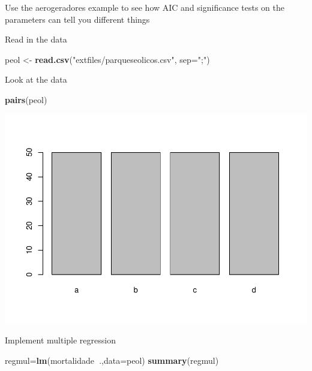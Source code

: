 \documentclass[
]{book}
\newenvironment{Shaded}{\begin{snugshade}}{\end{snugshade}}
\newcommand{\DataTypeTok}[1]{\textcolor[rgb]{0.13,0.29,0.53}{#1}}
\newcommand{\KeywordTok}[1]{\textcolor[rgb]{0.13,0.29,0.53}{\textbf{#1}}}
\newcommand{\NormalTok}[1]{#1}
\newcommand{\OperatorTok}[1]{\textcolor[rgb]{0.81,0.36,0.00}{\textbf{#1}}}
\newcommand{\StringTok}[1]{\textcolor[rgb]{0.31,0.60,0.02}{#1}}
\begin{document}
Use the aerogeradores example to see how AIC and significance tests on the parameters can tell you different things

Read in the data

\begin{Shaded}
\begin{Highlighting}[]
\NormalTok{peol <-}\StringTok{ }\KeywordTok{read.csv}\NormalTok{(}\StringTok{"extfiles/parqueseolicos.csv"}\NormalTok{, }\DataTypeTok{sep=}\StringTok{";"}\NormalTok{)}
\end{Highlighting}
\end{Shaded}

Look at the data

\begin{Shaded}
\begin{Highlighting}[]
\KeywordTok{pairs}\NormalTok{(peol)}
\end{Highlighting}
\end{Shaded}

\includegraphics{ECOMODbook_files/figure-latex/unnamed-chunk-4-1.pdf}

Implement multiple regression

\begin{Shaded}
\begin{Highlighting}[]
\NormalTok{regmul=}\KeywordTok{lm}\NormalTok{(mortalidade}\OperatorTok{~}\NormalTok{.,}\DataTypeTok{data=}\NormalTok{peol)}
\KeywordTok{summary}\NormalTok{(regmul)}
\end{Highlighting}
\end{Shaded}
\end{document}
